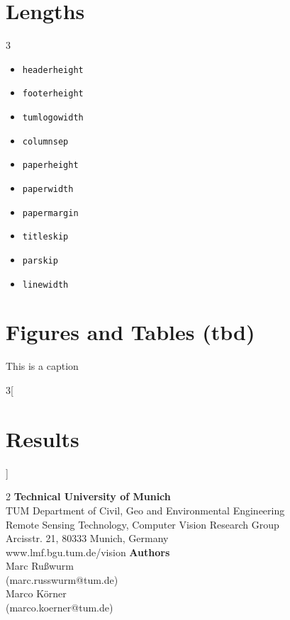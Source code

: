 \documentclass[a0]{tumposter}
\begin{document}
\section{Lengths}
\begin{multicols}{3}
\begin{itemize}
	\item \texttt{headerheight} \printlength\headerheight	
	\item \texttt{footerheight} \printlength\footerheight
	\item \texttt{tumlogowidth} \printlength\tumlogowidth
	\item \texttt{columnsep} \printlength\columnsep
	\item \texttt{paperheight} \printlength\paperheight
	\item \texttt{paperwidth} \printlength\paperheight
	\item \texttt{papermargin} \printlength\papermargin
	\item \texttt{titleskip} \printlength\titleskip
	\item \texttt{parskip} \printlength\parskip
	\item \texttt{linewidth} \printlength\linewidth
	\end{itemize}
	
\end{multicols}

\section{Figures and Tables (tbd)}

\caption{This is a caption}
\blindtext

\begin{multicols}{3}[\section{Results}]
	\blindtext
\end{multicols}

\begin{footer}
	\begin{multicols}{2}
		\textbf{Technical University of Munich}\\
		TUM Department of Civil, Geo and Environmental Engineering \\
		Remote Sensing Technology, Computer Vision Research Group \\
		Arcisstr. 21, 80333 Munich, Germany \\
		www.lmf.bgu.tum.de/vision
	\vfill\columnbreak
		\textbf{Authors} \\
		Marc Rußwurm \\ (marc.russwurm@tum.de) \\
		Marco Körner \\ (marco.koerner@tum.de)
	\vfill
	\end{multicols}
\end{footer}
\end{document}
